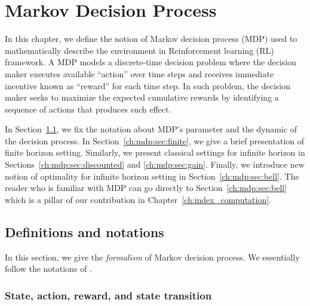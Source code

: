 
\chapter{Markov Decision Process}
\label{ch:mdp}


In this chapter, we define the notion of Markov decision process (MDP) used to mathematically describe the environment in Reinforcement learning (RL) framework.
A MDP models a discrete-time decision problem where the decision maker executes available ``action'' over time steps and receives immediate incentive known as ``reward'' for each time step.
In such problem, the decision maker seeks to maximize the expected cumulative rewards by identifying a sequence of actions that produces such effect.

In Section~\ref{ch:mdp:sec:defn}, we fix the notation about MDP's parameter and the dynamic of the decision process.
In Section~\ref{ch:mdp:sec:finite}, we give a brief presentation of finite horizon setting.
Similarly, we present classical settings for infinite horizon in Sections~\ref{ch:mdp:sec:discounted} and \ref{ch:mdp:sec:gain}.
Finally, we introduce new notion of optimality for infinite horizon setting in Section~\ref{ch:mdp:sec:bell}.
The reader who is familiar with MDP can go directly to Section~\ref{ch:mdp:sec:bell} which is a pillar of our contribution in Chapter~\ref{ch:index_computation}.


\section{Definitions and notations}
\label{ch:mdp:sec:defn}

In this section, we give the \emph{formalism} of Markov decision process.%
We essentially follow the notations of \cite{puterman2014markov}.

\subsection{State, action, reward, and state transition}

